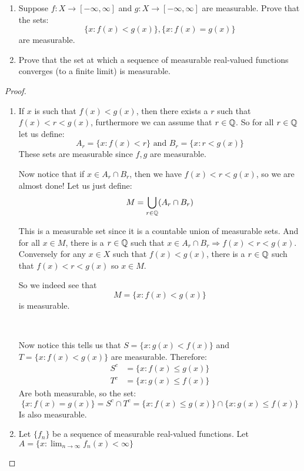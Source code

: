     \begin{exercise}
        \begin{enumerate}[label = (\alph*)]
            \item Suppose $f\colon X\rightarrow [-\infty,\infty]$ and $g\colon X\rightarrow [-\infty, \infty]$ are measurable. Prove that the sets:\[
                \{x\colon f(x)<g(x)\}, \{x\colon f(x) = g(x)\}    
            \] are measurable.
            \item Prove that the set at which a sequence of measurable real-valued functions converges (to a finite limit) is measurable.
        \end{enumerate}
\begin{proof}
    \begin{enumerate}[label = (\alph*)]
        \item If $x$ is such that $f(x)<g(x)$, then there exists a $r$ such that $f(x)<r<g(x)$, furthermore we can assume that $r\in \mathbb{Q}$. So for all $r\in \mathbb{Q}$ let us define:\begin{equation*}
            A_r = \{x\colon f(x)<r\} \text{ and } B_r = \{x\colon r<g(x)\}
        \end{equation*}
        These sets are measurable since $f,g$ are measurable.

        Now notice that if $x\in A_r\cap B_r$, then we have $f(x)<r<g(x)$, so we are almost done! Let us just define:\begin{equation*}
            M = \bigcup_{r\in \mathbb{Q}}(A_r\cap B_r)
        \end{equation*}

        This is a measurable set since it is a countable union of measurable sets. And for all $x\in M$, there is a $r\in \mathbb{Q}$ such that $x\in A_r\cap B_r \Rightarrow f(x)<r<g(x)$. Conversely for any $x\in X$ such that $f(x)<g(x)$, there is a $r\in \mathbb{Q}$ such that $f(x)<r<g(x)$ so $x\in M$.

        So we indeed see that \[M = \{x\colon f(x)<g(x)\}\] is measurable.

        \

        Now notice this tells us that $S = \{x\colon g(x)<f(x)\}$ and $T = \{x\colon f(x)<g(x)\}$ are measurable. Therefore:\begin{align*}
            S^c &= \{x\colon f(x)\leq g(x)\}\\
            T^c &= \{x\colon g(x)\leq f(x)\}
        \end{align*}
        Are both measurable, so the set:\[\{x\colon f(x) = g(x)\} = S^c\cap T^c = \{x\colon f(x)\leq g(x)\}\cap\{x\colon g(x)\leq f(x)\}\] Is also measurable.
    
        \item Let $\{f_n\}$ be a sequence of measurable real-valued functions. Let $A = \{x\colon \lim_{n\rightarrow \infty}f_n(x)<\infty\}$
    \end{enumerate}
\end{proof}
    \end{exercise}


